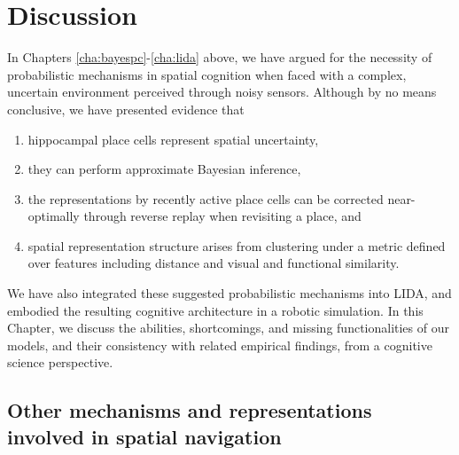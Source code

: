 \chapter{Discussion}
\label{cha:discussion}

In Chapters \ref{cha:bayespc}-\ref{cha:lida} above, we have argued for the necessity of probabilistic mechanisms in spatial cognition when faced with a complex, uncertain environment perceived through noisy sensors. Although by no means conclusive, we have presented evidence that

\begin{enumerate}
	\item hippocampal place cells represent spatial uncertainty, 
	\item they can perform approximate Bayesian inference,
	\item the representations by recently active place cells can be corrected near-optimally through reverse replay when revisiting a place, and
	\item spatial representation structure arises from clustering under a metric defined over features including distance and visual and functional similarity.
\end{enumerate}

We have also integrated these suggested probabilistic mechanisms into LIDA, and embodied the resulting cognitive architecture in a robotic simulation. In this Chapter, we discuss the abilities, shortcomings, and missing functionalities of our models, and their consistency with related empirical findings, from a cognitive science perspective. 


\section{Other mechanisms and representations involved in spatial navigation}


